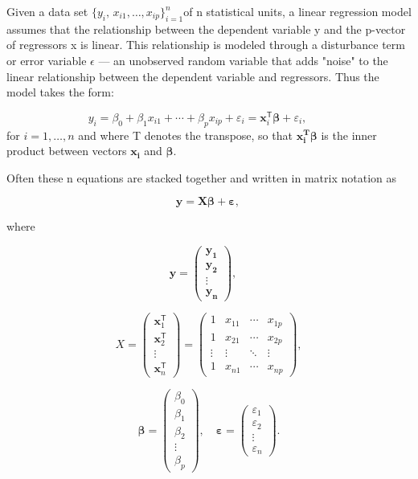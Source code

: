 \documentclass[conference]{IEEEtran}
\begin{document}
Given a data set $  {\displaystyle \{y_{i},\,x_{i1},\ldots ,x_{ip}\}_{i=1}^{n}}  $of n statistical units, a linear regression model assumes that the relationship between the dependent variable y and the p-vector of regressors x is linear. This relationship is modeled through a disturbance term or error variable $\epsilon$ — an unobserved random variable that adds "noise" to the linear relationship between the dependent variable and regressors. Thus the model takes the form:

$$ {\displaystyle y_{i}=\beta _{0}+\beta _{1}x_{i1}+\cdots +\beta _{p}x_{ip}+\varepsilon _{i}=\mathbf {x} _{i}^{\mathsf {T}}{\boldsymbol {\beta }}+\varepsilon _{i},\qquad } $$
for $i=1,\ldots ,n$ and where T denotes the transpose, so that $\mathbf{x_i^T\boldsymbol{\beta}}$ is the inner product between vectors $\mathbf{x_i}$ and $\mathbf{\boldsymbol{\beta}}$. 

Often these n equations are stacked together and written in matrix notation as

    $$ \mathbf {{y} =X{\boldsymbol {\beta }}+{\boldsymbol {\varepsilon }},\,}$$

where

    $$ \mathbf {{y} ={\begin{pmatrix}y_{1}\\y_{2}\\\vdots \\y_{n}\end{pmatrix}},\quad} $$

   $$ {\displaystyle X={\begin{pmatrix}\mathbf {x} _{1}^{\mathsf {T}}\\\mathbf {x} _{2}^{\mathsf {T}}\\\vdots \\\mathbf {x} _{n}^{\mathsf {T}}\end{pmatrix}}={\begin{pmatrix}1&x_{11}&\cdots &x_{1p}\\1&x_{21}&\cdots &x_{2p}\\\vdots &\vdots &\ddots &\vdots \\1&x_{n1}&\cdots &x_{np}\end{pmatrix}},}$$

    $${\displaystyle {\boldsymbol {\beta }}={\begin{pmatrix}\beta _{0}\\\beta _{1}\\\beta _{2}\\\vdots \\\beta _{p}\end{pmatrix}},\quad {\boldsymbol {\varepsilon }}={\begin{pmatrix}\varepsilon _{1}\\\varepsilon _{2}\\\vdots \\\varepsilon _{n}\end{pmatrix}}.}$$
\end{document}
